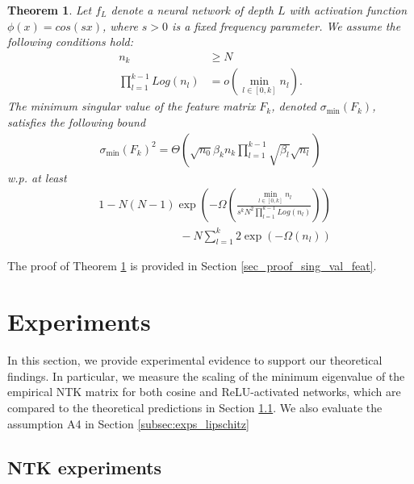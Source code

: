 \documentclass{article}
\theoremstyle{plain}
\newtheorem{Theorem}{Theorem}[section]
\theoremstyle{definition}
\theoremstyle{remark}
\begin{document}
\begin{Theorem}\label{sing_val_feat}
Let $f_L$ denote a neural network of depth $L$ with activation function $\phi(x) = cos(sx)$, where $s > 0$ is a fixed frequency parameter. We assume the following conditions hold:
\begin{align*}
    n_k &\geq N \\
    \prod_{l=1}^{k-1}Log(n_l) &= o\left(\min_{l \in [0,k]}n_l\right).
\end{align*}
The minimum singular value of the feature matrix $F_k$, denoted 
$\sigma_{\min}(F_{k})$, satisfies the following bound
\begin{align*}
    \sigma_{\min}\left(
F_k
\right)^2
= 
\Theta\left(
	\sqrt{n_0}\beta_kn_k\prod_{l=1}^{k-1}\sqrt{\beta_l}\sqrt{n_l}
	\right)
\end{align*}
w.p. at least
\begin{align*}
    &1 - N(N-1)\exp\left(-
\Omega\left(
\frac{\min_{l \in [0,k]}n_l}{s^kN^2\prod_{l=1}^{k-1}Log(n_l)}
\right)
\right) \\
&\hspace{3cm}- N\sum_{l=1}^k2\exp(-\Omega(n_l))
\end{align*}
\end{Theorem}

The proof of Theorem \ref{sing_val_feat} is provided in Section
\ref{sec_proof_sing_val_feat}.

\section{Experiments}\label{exps}
In this section, we provide experimental evidence to support our theoretical findings. In particular, we measure the scaling of the minimum eigenvalue of the empirical NTK matrix for both cosine and ReLU-activated networks, which are compared to the theoretical predictions in Section \ref{subsec:exps_ntk}. We also evaluate the assumption A4 in Section \ref{subsec:exps_lipschitz}

\subsection{NTK experiments}\label{subsec:exps_ntk}


\end{document}
